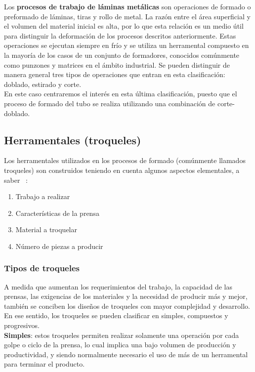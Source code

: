 Los \textbf{procesos de trabajo de láminas metálicas} son operaciones de formado o preformado 
de láminas, tiras y rollo de metal. La razón entre el área superficial y el volumen del material 
inicial es alta, por lo que esta relación es un medio útil para distinguir la deformación 
de los procesos descritos anteriormente. Estas operaciones se ejecutan siempre en frío y 
se utiliza un herramental compuesto en la mayoría de los casos de un conjunto de formadores, 
conocidos comúnmente como punzones y matrices en el ámbito industrial. Se pueden 
distinguir de manera general tres tipos de operaciones que entran en esta clasificación: 
doblado, estirado y corte.\\

En este caso centraremos el interés en esta última clasificación, puesto que el proceso 
de formado del tubo se realiza utilizando una combinación de corte-doblado.

\subsection{Herramentales (troqueles)}

Los herramentales utilizados en los procesos de formado (comúnmente llamados troqueles) son 
construidos teniendo en cuenta algunos aspectos elementales, a saber ~\cite{marin2009}:

\begin{enumerate}
\item Trabajo a realizar 
\item Características de la prensa
\item Material a troquelar
\item Número de piezas a producir
\end{enumerate}

\subsubsection{Tipos de troqueles}

A medida que aumentan los requerimientos del trabajo, la capacidad de las prensas, las exigencias 
de los materiales y la necesidad de producir más y mejor, también se conciben los diseños de 
troqueles con mayor complejidad y desarrollo. En ese sentido, los troqueles se pueden clasificar 
en simples, compuestos y progresivos.\\

\textbf{Simples}: estos troqueles permiten realizar solamente una operación por cada golpe o 
ciclo de la prensa, lo cual implica una bajo volumen de producción y productividad, y 
siendo normalmente necesario el uso de más de un herramental para terminar el producto.\\

